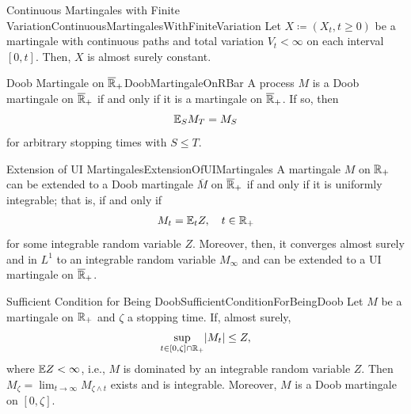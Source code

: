 \begin{lem}{Continuous Martingales with Finite Variation}{ContinuousMartingalesWithFiniteVariation}
	Let \(X \coloneqq (X_t, t \ge 0)\) be a martingale with continuous paths and total variation \(V_t < \infty\) on each interval \([0, t]\). Then, \(X\) is almost surely constant.
\end{lem}

\begin{prop}{Doob Martingale on \(\overline{\mathbb{R}}_+\)}{DoobMartingaleOnRBar}
	A process \(M\) is a Doob martingale on \(\overline{\mathbb{R}}_+\) if and only if it is a martingale on \(\overline{\mathbb{R}}_+\). If so, then
	\begin{equation}\label{eq:DoobMartingaleRBarProp}
		\mathbb{E}_S M_T = M_S
	\end{equation}
	for arbitrary stopping times with \(S \le T\).
\end{prop}

\begin{thm}{Extension of UI Martingales}{ExtensionOfUIMartingales}
	A martingale \(M\) on \(\mathbb{R}_+\) can be extended to a Doob martingale \(\overline{M}\) on \(\overline{\mathbb{R}}_+\) if and only if it is uniformly integrable; that is, if and only if
	\begin{equation}\label{eq:UIMartingaleExtension}
		M_t = \mathbb{E}_t Z, \quad t \in \mathbb{R}_+
	\end{equation}
	for some integrable random variable \(Z\). Moreover, then, it converges almost surely and in \(L^1\) to an integrable random variable \(M_\infty\) and can be extended to a UI martingale on \(\overline{\mathbb{R}}_+\).
\end{thm}

\begin{prop}{Sufficient Condition for Being Doob}{SufficientConditionForBeingDoob}
	Let \(M\) be a martingale on \(\mathbb{R}_+\) and \(\zeta\) a stopping time. If, almost surely,
	\begin{equation}\label{eq:DoobDominationCondition}
		\sup_{t \in [0,\zeta] \cap \mathbb{R}_{+}} \lvert M_t \rvert \le Z,
	\end{equation}
	where \(\mathbb{E} Z < \infty\), i.e., \(M\) is dominated by an integrable random variable \(Z\). Then \(M_\zeta = \lim_{t \to \infty} M_{\zeta \land t}\) exists and is integrable. 	Moreover, \(M\) is a Doob martingale on \([0, \zeta]\).
\end{prop}%
